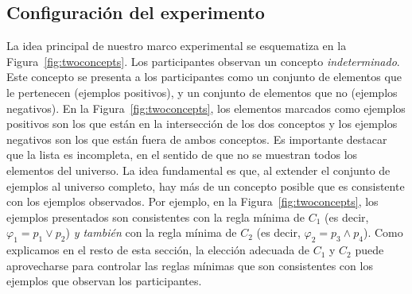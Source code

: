\subsection{Configuración del experimento}\label{Subsec:ExperimentFlow}
La idea principal de nuestro marco experimental se esquematiza en la Figura~\ref{fig:twoconcepts}. Los participantes observan un concepto \textit{indeterminado}. Este concepto se presenta a los participantes como un conjunto de elementos que le pertenecen (ejemplos positivos), y un conjunto de elementos que no (ejemplos negativos). En la Figura~\ref{fig:twoconcepts}, los elementos marcados como ejemplos positivos son los que están en la intersección de los dos conceptos y los ejemplos negativos son los que están fuera de ambos conceptos. Es importante destacar que la lista es incompleta, en el sentido de que no se muestran todos los elementos del universo. La idea fundamental es que, al extender el conjunto de ejemplos al universo completo, hay más de un concepto posible que es consistente con los ejemplos observados. Por ejemplo, en la Figura~\ref{fig:twoconcepts}, los ejemplos presentados son consistentes con la regla mínima de $C_1$ (es decir, $\varphi_1 = p_1 \lor p_2$) \textit {y también} con la regla mínima de $C_2$ (es decir, $\varphi_2 = p_3 \land p_4$). Como explicamos en el resto de esta sección, la elección adecuada de $C_1$ y $C_2$ puede aprovecharse para controlar las reglas mínimas que son consistentes con los ejemplos que observan los participantes.


